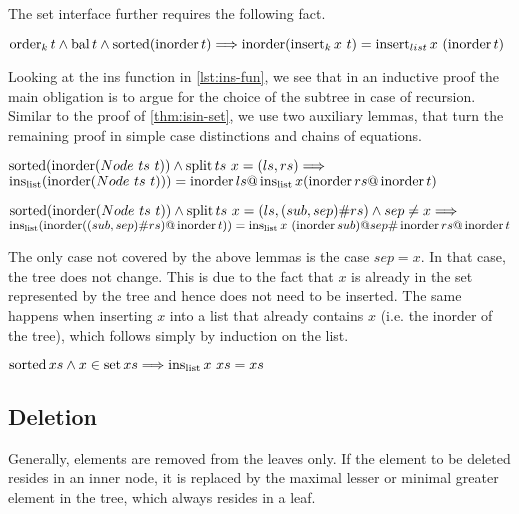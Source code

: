 The set interface further requires the following fact.
\begin{theorem}
    \label{thm:ins-set}
    $\operatorname{order}_k t \wedge \operatorname{bal} t \wedge \operatorname{sorted}  (\operatorname{inorder} t)\Longrightarrow
    \operatorname{inorder} (\operatorname{insert}_k x\ t) = \operatorname{insert}_{list} x\ (\operatorname{inorder} t)$
\end{theorem}

Looking at the ins function in \autoref{lst:ins-fun},
we see that in an inductive proof the main obligation
is to argue for the choice of the subtree in case of recursion.
Similar to the proof of \autoref{thm:isin-set},
we use two auxiliary lemmas, that turn the remaining
proof in simple case distinctions and chains of equations.

\begin{lemma}
    $\operatorname{sorted}(\operatorname{inorder} (Node\ ts\ t)) \wedge \operatorname{split} ts\ x = (ls, rs) \Longrightarrow$ \\
    $\operatorname{ins_{list}} (\operatorname{inorder} (Node\ ts\ t))) = \operatorname{inorder} ls @ \operatorname{ins_{list}} x (\operatorname{inorder} rs @ \operatorname{inorder} t)$
\end{lemma}

\begin{lemma}
    $\operatorname{sorted} (\operatorname{inorder} (Node\ ts\ t)) \wedge \operatorname{split} ts\ x = (ls, (sub,sep)\#rs) \wedge sep \neq x \Longrightarrow$ \\
    $\operatorname{ins_{list}} (\operatorname{inorder} ((sub,sep)\#rs) @ \operatorname{inorder} t)) = \operatorname{ins_{list}} x\ (\operatorname{inorder} sub) @ sep \# \operatorname{inorder} rs @ \operatorname{inorder} t$
\end{lemma}

The only case not covered by the above lemmas is the case $sep = x$.
In that case, the tree does not change.
This is due to the fact that $x$ is already in the set represented by the tree
and hence does not need to be inserted.
The same happens when inserting $x$ into a list that already contains $x$
(i.e. the inorder of the tree),
which follows simply by induction on the list.

\begin{lemma}
    $\operatorname{sorted} xs \wedge x \in \operatorname{set} xs \Longrightarrow \operatorname{ins_{list}} x\ xs = xs$
\end{lemma}


\subsection{Deletion}

Generally, elements are removed from the leaves only.
If the element to be deleted resides in an inner node,
it is replaced by the maximal lesser or minimal greater
element in the tree, which always resides in a leaf.

